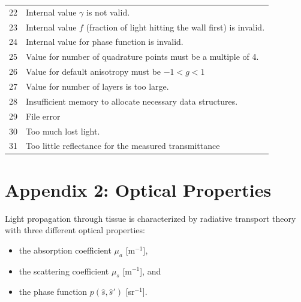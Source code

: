 \documentclass{article}
\begin{document}
\begin{table}[!b]
\begin{center}
\begin{tabular}{cp{10cm}}
 22    & Internal value $\gamma$ is not valid. \\
 23    & Internal value $f$ (fraction of light hitting the wall first) is invalid. \\
 24    & Internal value for phase function is invalid.\\[2mm]

 25    & Value for number of quadrature points must be a multiple of 4. \\
 26    & Value for default anisotropy must be $-1<g<1$ \\
 27    & Value for number of layers is too large.\\[2mm]
 
 28    & Insufficient memory to allocate necessary data structures.\\
 29    & File error \\[2mm]

 30    & Too much lost light.\\
 31    & Too little reflectance for the measured transmittance \\[2mm]
\end{tabular}
\end{center}
\end{table}

\clearpage
\section*{Appendix 2: Optical Properties}

Light propagation through tissue is characterized by radiative transport theory
with three different optical properties:

\begin{itemize}
\item
the absorption coefficient $\mu_a$ [m$^{-1}$],
\item
the scattering coefficient $\mu_s$ [m$^{-1}$], and
\item
the phase function $p(\hat{s},\hat{s}')$ [sr$^{-1}$].
\end{itemize}
\end{document}
